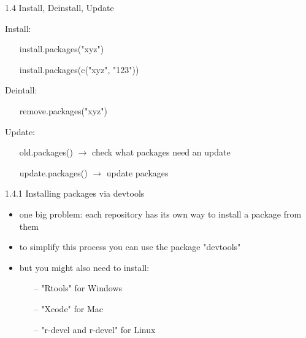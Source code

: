 \documentclass[11pt,a4paper]{beamer}
\begin{document}
\begin{frame}[t]{1.4 Install, Deinstall, Update}
	

		\begin{block}{Install:}
			\begin{itemize}
				\item[] install.packages("xyz") 
				\item[]install.packages(c("xyz", "123"))
			\end{itemize}
		\end{block}
	

		\begin{block}{Deintall:}
			\begin{itemize}		
				\item[] remove.packages("xyz")
			\end{itemize}
		\end{block}


		\begin{block}{Update:}
			\begin{itemize}
				\item[] old.packages() $ \rightarrow $ check what packages need an update
				\item[] update.packages() $ \rightarrow $ update packages
			\end{itemize}
		\end{block}
\end{frame}






\begin{frame}[t]{1.4.1 Installing packages via devtools}
	
	\begin{itemize}
		\item one big problem: each repository has its own way to install a package from them
		\item to simplify this process you can use the package "devtools"
		\item but you might also need to install: 
		\begin{itemize}
			\item[--]"Rtools" for Windows
			\item[--]"Xcode" for Mac 
			\item[--]"r-devel and r-devel" for Linux
		\end{itemize}
			
	\end{itemize}

\end{frame}
\end{document}
